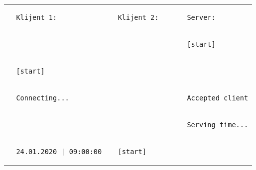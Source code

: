 \documentclass[]{article}
\begin{document}
\begin{enumerate}
  \vspace{10pt}
  \noindent
  \begin{tabular}{lll}
  \begin{lstlisting}
  Klijent 1:
  \end{lstlisting}&
  \begin{lstlisting}
  Klijent 2:
  \end{lstlisting}&
  \begin{lstlisting}
  Server:
  \end{lstlisting}\\
  \begin{lstlisting}
  \end{lstlisting}&
  \begin{lstlisting}      
  \end{lstlisting}&
  \begin{lstlisting}
  [start]
  \end{lstlisting}\\
  \begin{lstlisting}
  [start]
  \end{lstlisting}&
  \begin{lstlisting}      
  \end{lstlisting}&
  \begin{lstlisting}
  \end{lstlisting}\\
  \begin{lstlisting}
  Connecting...
  \end{lstlisting}&
  \begin{lstlisting}      
  \end{lstlisting}&
  \begin{lstlisting}
  Accepted client
  \end{lstlisting}\\
  \begin{lstlisting}
  \end{lstlisting}&
  \begin{lstlisting}    
  \end{lstlisting}&
  \begin{lstlisting}
  Serving time...
  \end{lstlisting}\\
  \begin{lstlisting}
  24.01.2020 | 09:00:00
  \end{lstlisting}&
  \begin{lstlisting}  
  [start]      
  \end{lstlisting}&
  \begin{lstlisting}

\end{lstlisting}
\end{tabular}
\end{enumerate}
\end{document}
